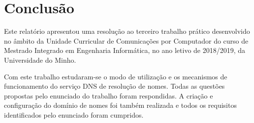 
\section{Conclusão}
\label{sec:conclusao}

Este relatório apresentou uma resolução ao terceiro trabalho prático desenvolvido no âmbito da Unidade Curricular de Comunicações por Computador do curso de Mestrado Integrado em Engenharia Informática, no ano letivo de 2018/2019, da Universidade do Minho.

Com este trabalho estudaram-se o modo de utilização e os mecanismos de funcionamento do serviço DNS de resolução de nomes. Todas as questões propostas pelo enunciado do trabalho foram respondidas. A criação e configuração do domínio de nomes  foi também realizada e todos os requisitos identificados pelo enunciado foram cumpridos.

